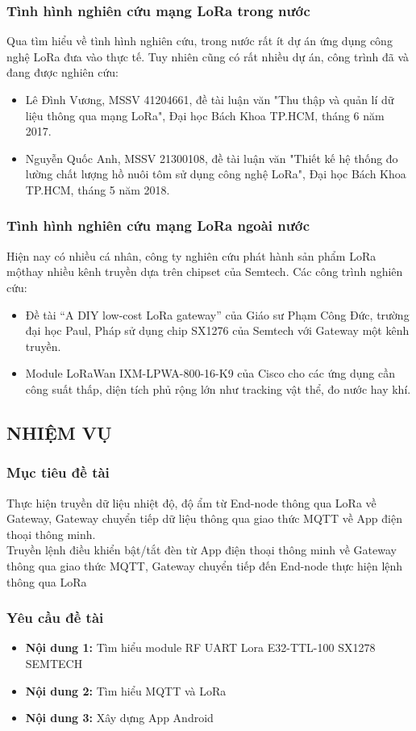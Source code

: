 \subsubsection{Tình hình nghiên cứu mạng LoRa trong nước}
Qua tìm hiểu về tình hình nghiên cứu, trong nước rất ít dự án ứng dụng công nghệ LoRa đưa vào thực tế. Tuy nhiên cũng có rất nhiều dự án, công trình đã và đang được nghiên cứu:
\begin{itemize}
	\item Lê Đình Vương, MSSV 41204661, đề tài luận văn "Thu thập và quản lí dữ liệu thông qua mạng LoRa", Đại học Bách Khoa TP.HCM, tháng 6 năm 2017.
	\item Nguyễn Quốc Anh, MSSV 21300108, đề tài luận văn "Thiết kế hệ thống đo lường chất lượng hồ nuôi tôm sử dụng công nghệ LoRa", Đại học Bách Khoa TP.HCM, tháng 5 năm 2018.
\end{itemize}
\subsubsection{Tình hình nghiên cứu mạng LoRa ngoài nước}
Hiện nay có nhiều cá nhân, công ty nghiên cứu phát hành sản phẩm LoRa mộthay nhiều kênh truyền dựa trên chipset của Semtech. Các công trình nghiên cứu:
\begin{itemize}
	\item Đề tài “A DIY low-cost LoRa gateway” của Giáo sư Phạm Công Đức, trường đại học Paul, Pháp sử dụng chip SX1276 của Semtech với Gateway một kênh truyền.
	\item Module LoRaWan IXM-LPWA-800-16-K9 của Cisco cho các ứng dụng cần công suất thấp, diện tích phủ rộng lớn như tracking vật thể, đo nước hay khí.
\end{itemize}
\subsection{NHIỆM VỤ}
\subsubsection{Mục tiêu đề tài}
Thực hiện truyền dữ liệu nhiệt độ, độ ẩm từ End-node thông qua LoRa về Gateway, Gateway chuyển tiếp dữ liệu thông qua giao thức MQTT về App điện thoại thông minh.\\
\indent Truyền lệnh điều khiển bật/tắt đèn từ App điện thoại thông minh về Gateway thông qua giao thức MQTT, Gateway chuyển tiếp đến End-node thực hiện lệnh thông qua LoRa
\subsubsection{Yêu cầu đề tài}
\begin{itemize}
	\item \textbf{Nội dung 1:} Tìm hiểu module RF UART Lora E32-TTL-100 SX1278 SEMTECH
	\item \textbf{Nội dung 2:} Tìm hiểu MQTT và LoRa
	\item \textbf{Nội dung 3:} Xây dựng App Android
\end{itemize}
